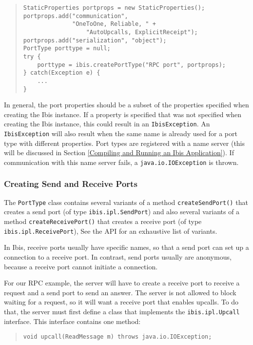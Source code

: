 \documentclass[10pt]{article}
\begin{document}
\begin{quote}
\begin{verbatim}
StaticProperties portprops = new StaticProperties();
portprops.add("communication",
              "OneToOne, Reliable, " + 
                  "AutoUpcalls, ExplicitReceipt");
portprops.add("serialization", "object");
PortType porttype = null;
try {
    porttype = ibis.createPortType("RPC port", portprops);
} catch(Exception e) {
    ...
}
\end{verbatim}
\end{quote}
\noindent
In general, the port properties should be a subset of the properties
specified when creating the Ibis instance. If a property is specified
that was not specified when creating the Ibis instance, this could
result in an \texttt{IbisException}.
An \texttt{IbisException} will also result when the same name is
already used for a port type with different properties.
Port types are registered with a name server
(this will be discussed in Section \ref{Compiling and Running an Ibis Application}).
If communication with this name server fails, a
\texttt{java.io.IOException} is thrown.

\subsubsection{Creating Send and Receive Ports}

The \texttt{PortType} class contains several variants of a method
\texttt{createSendPort()} that creates a send port (of type
\texttt{ibis.ipl.SendPort}) and
also several variants of a method \texttt{createReceivePort()} that
creates a receive port (of type \texttt{ibis.ipl.ReceivePort}),
See the API for an exhaustive list of variants.

In Ibis, receive ports usually have specific names, so that
a send port can set up a connection to a receive port. In contrast,
send ports usually are anonymous, because a receive port cannot
initiate a connection.

For our RPC example, the server will have to create a receive port
to receive a request and a send port to send an answer.
The server is not allowed to block waiting for a request, so it will
want a receive port that enables upcalls.
To do that, the server must first define a class that implements
the \texttt{ibis.ipl.Upcall} interface. This interface contains one
method:

\begin{quote}
\begin{verbatim}
void upcall(ReadMessage m) throws java.io.IOException;
\end{verbatim}
\end{quote}
\end{document}
